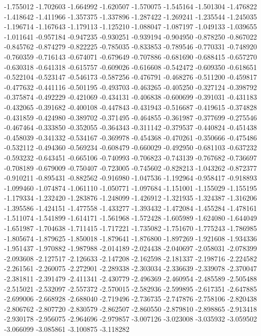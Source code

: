 -1.755012
-1.702603
-1.664992
-1.620507
-1.570075
-1.545164
-1.501304
-1.476822
-1.418642
-1.411966
-1.357375
-1.337896
-1.287422
-1.269241
-1.235544
-1.245035
-1.196714
-1.167643
-1.179113
-1.125210
-1.088047
-1.087197
-1.049133
-1.039655
-1.011641
-0.957184
-0.947235
-0.930251
-0.939194
-0.904950
-0.878250
-0.867022
-0.845762
-0.874279
-0.822225
-0.785035
-0.833853
-0.789546
-0.770331
-0.748920
-0.760359
-0.716143
-0.674071
-0.679649
-0.707886
-0.681690
-0.688415
-0.657270
-0.630318
-0.641318
-0.615757
-0.609026
-0.616608
-0.542472
-0.609350
-0.618651
-0.522104
-0.523147
-0.546173
-0.587256
-0.476791
-0.468276
-0.511200
-0.459817
-0.477632
-0.441116
-0.501195
-0.493703
-0.463265
-0.405250
-0.327124
-0.398792
-0.375874
-0.492229
-0.421069
-0.434131
-0.406838
-0.600699
-0.391031
-0.431183
-0.432065
-0.391682
-0.400108
-0.447843
-0.431943
-0.516687
-0.419615
-0.374828
-0.431859
-0.424980
-0.389702
-0.371495
-0.464855
-0.361987
-0.377699
-0.275546
-0.467464
-0.333850
-0.352055
-0.364343
-0.311142
-0.379537
-0.440824
-0.451438
-0.458039
-0.341332
-0.534167
-0.369978
-0.454368
-0.470261
-0.350666
-0.475486
-0.532112
-0.494360
-0.569234
-0.608479
-0.660029
-0.492950
-0.681103
-0.637232
-0.593232
-0.643451
-0.665106
-0.740993
-0.706823
-0.743139
-0.767682
-0.736697
-0.708189
-0.679009
-0.750407
-0.723005
-0.745602
-0.828213
-1.043262
-0.872377
-0.910211
-0.895431
-0.882562
-0.916980
-1.047536
-1.192964
-0.958417
-0.918893
-1.099460
-1.074874
-1.061110
-1.050771
-1.097684
-1.151001
-1.155029
-1.155195
-1.179334
-1.232420
-1.283876
-1.248099
-1.426912
-1.321935
-1.324387
-1.316206
-1.395586
-1.424151
-1.477558
-1.433277
-1.393432
-1.472084
-1.455284
-1.478161
-1.511074
-1.541899
-1.614171
-1.561968
-1.572428
-1.605989
-1.624080
-1.644049
-1.651987
-1.704638
-1.711415
-1.717221
-1.735082
-1.751670
-1.775243
-1.786985
-1.805674
-1.879625
-1.850018
-1.879641
-1.876800
-1.897269
-1.921608
-1.934336
-1.951437
-1.970882
-1.987988
-2.014189
-2.024438
-2.040697
-2.058031
-2.078399
-2.093608
-2.127517
-2.126633
-2.147208
-2.162598
-2.181337
-2.198716
-2.224582
-2.261561
-2.260075
-2.272901
-2.289338
-2.303034
-2.336639
-2.339078
-2.370047
-2.381811
-2.391479
-2.411341
-2.430779
-2.496369
-2.460954
-2.485589
-2.505488
-2.515021
-2.532097
-2.557372
-2.570015
-2.582936
-2.599895
-2.617351
-2.647885
-2.699006
-2.668928
-2.688040
-2.719496
-2.736735
-2.747876
-2.758106
-2.820438
-2.806762
-2.807720
-2.830579
-2.862507
-2.860550
-2.879810
-2.898865
-2.913418
-2.930178
-2.956075
-2.964696
-2.979857
-3.007126
-3.023008
-3.035932
-3.059502
-3.066099
-3.085861
-3.100875
-3.118282
